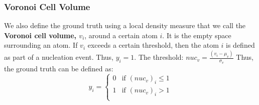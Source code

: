 
\frame
{
\frametitle{Voronoi Cell Volume}
\begin{block}{}
We also define the ground truth using a local density measure that we call the \textbf{Voronoi cell volume, $v_i$}, around a certain atom $i$. It is the empty space surrounding an atom.
\newline\newline
If $v_i$ exceeds a certain threshold, then the atom $i$ is defined as part of a nucleation event. Thus, $y_i = 1$.
\newline\newline
The threshold:
\centering $nuc_v = \frac{(v_i - \mu_v)}{\sigma_v}$
Thus, the ground truth can be defined as:
    \[
    y_i = \begin{cases}
      0 & \text{if }(nuc_v)_i \le 1 \\
      1 & \text{if }(nuc_v)_i > 1 \\
    \end{cases} 
    \]
\end{block}
}

